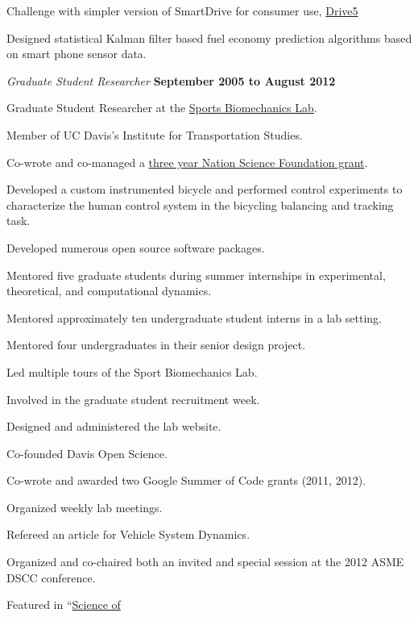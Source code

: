 \documentclass[10pt]{article}
\newenvironment{outerlist}[1][\enskip\textbullet]%
        {\begin{itemize}[#1]}{\end{itemize}%
         \vspace{-.6\baselineskip}}
\newenvironment{innerlist}[1][\enskip\textbullet]%
        {\begin{compactitem}[#1]}{\end{compactitem}}
\begin{document}
\begin{outerlist}
\begin{innerlist}
      Challenge with simpler version of SmartDrive for consumer use,
      \href{http://drive5.us}{Drive5}
    \item Designed statistical Kalman filter based fuel economy prediction
      algorithms based on smart phone sensor data.
  \end{innerlist}
  \item[] \textit{Graduate Student Researcher}%
        \hfill \textbf{September 2005 to August 2012}
  \begin{innerlist}
    \item Graduate Student Researcher at the
      \href{http://biosport.ucdavis.edu}{Sports Biomechanics Lab}.
    \item Member of UC Davis's Institute for Transportation Studies.
    \item Co-wrote and co-managed a
        \href{http://nsf.gov/awardsearch/showAward.do?AwardNumber=0928339}{three year
        Nation Science Foundation grant}.
    \item Developed a custom instrumented bicycle and performed control
        experiments to characterize the human control system in the bicycling
        balancing and tracking task.
    \item Developed numerous open source software packages.
    \item Mentored five graduate students during summer internships in
      experimental, theoretical, and computational dynamics.
    \item Mentored approximately ten undergraduate student interns in a lab
      setting.
    \item Mentored four undergraduates in their senior design project.
    \item Led multiple tours of the Sport Biomechanics Lab.
    \item Involved in the graduate student recruitment week.
    \item Designed and administered the lab website.
    \item Co-founded Davis Open Science.
    \item Co-wrote and awarded two Google Summer of Code grants (2011, 2012).
    \item Organized weekly lab meetings.
    \item Refereed an article for Vehicle System Dynamics.
    \item Organized and co-chaired both an invited and special session at the
      2012 ASME DSCC conference.
    \item Featured in ``\href{http://youtu.be/HcYbn_RCLiw}{Science of
}
\end{innerlist}
\end{outerlist}
\end{document}
